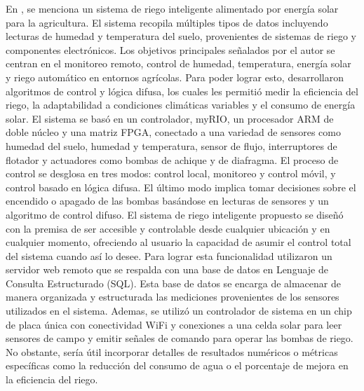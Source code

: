 \bigbreak
En \cite{al-ali_iot-solar_2019}, se menciona un sistema de riego inteligente alimentado por energía solar para la agricultura. El sistema recopila múltiples tipos de datos incluyendo lecturas de humedad y temperatura del suelo, provenientes de sistemas de riego y componentes electrónicos. Los objetivos principales señalados por el autor se centran en el monitoreo remoto, control de humedad, temperatura, energía solar y riego automático en entornos agrícolas. Para poder lograr esto, desarrollaron algoritmos de control y lógica difusa, los cuales les permitió medir la eficiencia del riego, la adaptabilidad a condiciones climáticas variables y el consumo de energía solar. El sistema se basó en un controlador, myRIO, un procesador ARM de doble núcleo y una matriz FPGA, conectado a una variedad de sensores como humedad del suelo, humedad y temperatura, sensor de flujo, interruptores de flotador y actuadores como bombas de achique y de diafragma. El proceso de control se desglosa en tres modos: control local, monitoreo y control móvil, y control basado en lógica difusa. El último modo implica tomar decisiones sobre el encendido o apagado de las bombas basándose en lecturas de sensores y un algoritmo de control difuso. El sistema de riego inteligente propuesto se diseñó con la premisa de ser accesible y controlable desde cualquier ubicación y en cualquier momento, ofreciendo al usuario la capacidad de asumir el control total del sistema cuando así lo desee. Para lograr esta funcionalidad utilizaron un servidor web remoto que se respalda con una base de datos en Lenguaje de Consulta Estructurado (SQL). Esta base de datos se encarga de almacenar de manera organizada y estructurada las mediciones provenientes de los sensores utilizados en el sistema. Ademas, se utilizó un controlador de sistema en un chip de placa única con conectividad WiFi y conexiones a una celda solar para leer sensores de campo y emitir señales de comando para operar las bombas de riego. No obstante, sería útil incorporar detalles de resultados numéricos o métricas específicas como la reducción del consumo de agua o el porcentaje de mejora en la eficiencia del riego.

